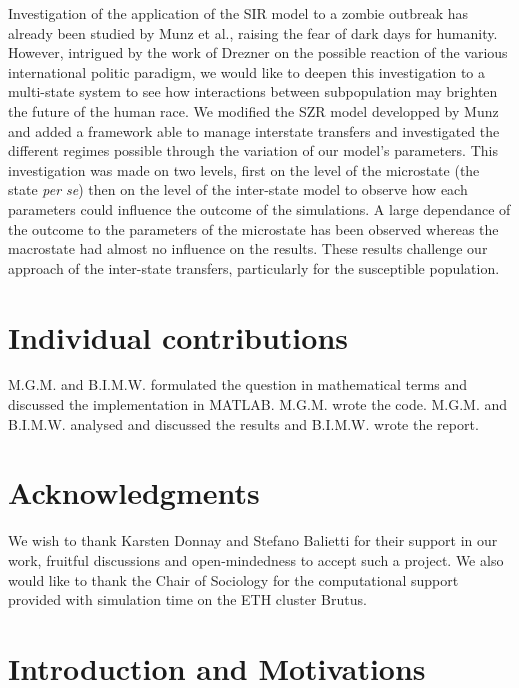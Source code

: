 \documentclass[11pt]{article} %
\begin{document}
Investigation of the application of the SIR model to a zombie outbreak has already been studied by Munz et al., raising the fear of dark days for humanity. However, intrigued by the work of Drezner on the possible reaction of the various international politic paradigm, we would like to deepen this investigation to a multi-state system to see how interactions between subpopulation may brighten the future of the human race. We modified the SZR model developped by Munz and added a framework able to manage interstate transfers and investigated the different regimes possible through the variation of our model's parameters. This investigation was made on two levels, first on the level of the microstate (the state \textit{per se}) then on the level of the inter-state model to observe how each parameters could influence the outcome of the simulations. A large dependance of the outcome to the parameters of the microstate has been observed whereas the macrostate had almost no influence on the results. These results challenge our approach of the inter-state transfers, particularly for the susceptible population. 



\section{Individual contributions}\indent

M.G.M. and B.I.M.W. formulated the question in mathematical terms and discussed the implementation in MATLAB. M.G.M. wrote the code. M.G.M. and B.I.M.W. analysed and discussed the results and B.I.M.W. wrote the report.

\section{Acknowledgments}\indent

We wish to thank Karsten Donnay and Stefano Balietti for their support in our work, fruitful discussions and open-mindedness to accept such a project. We also would like to thank the Chair of Sociology for the computational support provided with simulation time on the ETH cluster Brutus.







\newpage
\section{Introduction and Motivations}\indent
\end{document}
